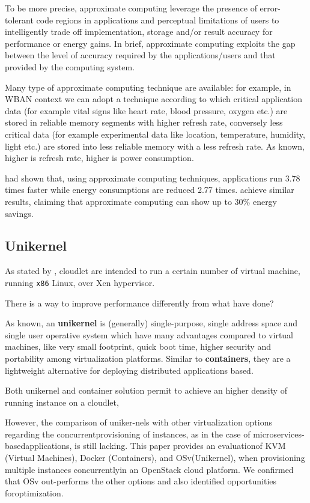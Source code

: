\documentclass[sigchi]{acmart}
\begin{document}
To be more precise, approximate computing leverage the presence of error-tolerant code regions in applications and perceptual limitations of users to intelligently trade off implementation, storage and/or result accuracy for performance or energy gains. In brief, approximate computing exploits the gap between the level of accuracy required by the applications/users and that provided by the computing system.

Many type of approximate computing technique are available: for example, in WBAN context we can adopt a technique according to which critical application data (for example vital signs like heart rate, blood pressure, oxygen etc.) are stored in reliable memory segments with higher refresh rate, conversely less critical data (for example experimental data like location, temperature, humidity, light etc.) are stored into less reliable memory with a less refresh rate. As known, higher is refresh rate, higher is power consumption.\cite{Towards}

\cite{ApproximateComputingArticle} had shown that, using approximate computing techniques, applications run 3.78 times faster while energy consumptions are reduced 2.77 times. \citet{ImpactApproximation} achieve similar results, claiming that approximate computing can show up to 30\% energy savings.

\subsection{Unikernel}

As stated by \citet{MSAReport}, cloudlet are intended to run a certain number of virtual machine, running \texttt{x86} Linux, over Xen hypervisor. 

There is a way to improve performance differently from what \citep{MSAReport} have done? 

As known, an \textbf{unikernel} is (generally) single-purpose, single address space and single user operative system which have many advantages compared to virtual machines, like very small footprint, quick boot time, higher security and portability among virtualization platforms. Similar to \textbf{containers}, they are  a  lightweight  alternative  for  deploying  distributed  applications based. 

Both unikernel and container solution permit to achieve an higher density of running instance on a cloudlet, 


However, the comparison of uniker-nels  with  other  virtualization  options  regarding  the  concurrentprovisioning  of  instances,  as  in  the  case  of  microservices-basedapplications,  is  still  lacking.  This  paper  provides  an  evaluationof   KVM   (Virtual   Machines),  Docker   (Containers),  and   OSv(Unikernel),  when  provisioning  multiple  instances  concurrentlyin  an  OpenStack  cloud  platform.  We  confirmed  that  OSv  out-performs  the other  options and  also  identified opportunities foroptimization.
\end{document}
